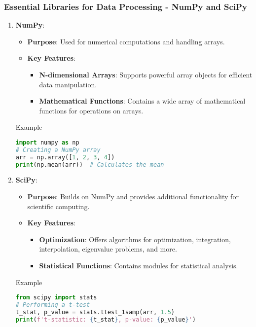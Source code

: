 \documentclass[aspectratio=169]{beamer}
\begin{document}
\begin{frame}[fragile]
    \frametitle{Essential Libraries for Data Processing - NumPy and SciPy}
    \begin{enumerate}
        \item \textbf{NumPy}:
        \begin{itemize}
            \item \textbf{Purpose}: Used for numerical computations and handling arrays.
            \item \textbf{Key Features}:
            \begin{itemize}
                \item \textbf{N-dimensional Arrays}: Supports powerful array objects for efficient data manipulation.
                \item \textbf{Mathematical Functions}: Contains a wide array of mathematical functions for operations on arrays.
            \end{itemize}
        \end{itemize}
        \begin{block}{Example}
        \begin{lstlisting}[language=Python]
import numpy as np
# Creating a NumPy array
arr = np.array([1, 2, 3, 4])
print(np.mean(arr))  # Calculates the mean
        \end{lstlisting}
        \end{block}
        
        \item \textbf{SciPy}:
        \begin{itemize}
            \item \textbf{Purpose}: Builds on NumPy and provides additional functionality for scientific computing.
            \item \textbf{Key Features}:
            \begin{itemize}
                \item \textbf{Optimization}: Offers algorithms for optimization, integration, interpolation, eigenvalue problems, and more.
                \item \textbf{Statistical Functions}: Contains modules for statistical analysis.
            \end{itemize}
        \end{itemize}
        \begin{block}{Example}
        \begin{lstlisting}[language=Python]
from scipy import stats
# Performing a t-test
t_stat, p_value = stats.ttest_1samp(arr, 1.5)
print(f't-statistic: {t_stat}, p-value: {p_value}')
        \end{lstlisting}
        \end{block}
    \end{enumerate}
\end{frame}
\end{document}
